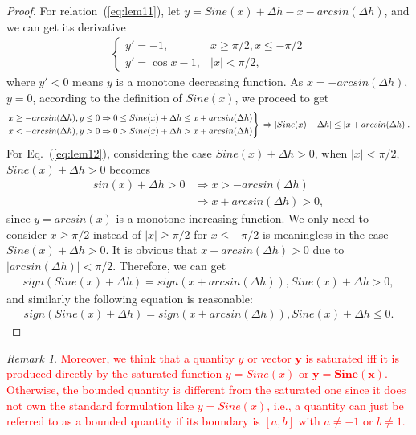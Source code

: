 \documentclass[3p]{elsarticle}
\theoremstyle{plain}
\theoremstyle{remark}
\newtheorem{myrem}{Remark}
\begin{document}
\begin{proof}
For relation~(\ref{eq:lem11}), let $y=Sine(x)+\Delta h-x-arcsin(\Delta h)$, and we can get its derivative
\begin{align}
\begin{cases}
y' = -1,&x\ge\pi/2,x\le-\pi/2\\
y' = \cos x - 1,&\vert x\vert<\pi/2,
\end{cases}
\end{align}
where $y'<0$ means $y$ is a monotone decreasing function. As $x=-arcsin(\Delta h)$, $y=0$, according to the definition of $Sine(x)$, we proceed to get
$$\left.
\begin{aligned}
x\ge-arcsin(\Delta h), y\le0&\Rightarrow 0\le Sine(x)+\Delta h\le x+arcsin(\Delta h)\\
x<-arcsin(\Delta h), y>0&\Rightarrow 0> Sine(x)+\Delta h>x+arcsin(\Delta h)\end{aligned}\right\}\\\\
\Rightarrow\vert Sine(x)+\Delta h\vert\le\vert x+arcsin(\Delta h)\vert.
$$
For Eq.~(\ref{eq:lem12}), considering the case $Sine(x)+\Delta h>0$, when $\vert x\vert<\pi/2$, $Sine(x)+\Delta h>0$ becomes
\begin{align}
sin(x)+\Delta h>0&\Rightarrow x>-arcsin(\Delta h)\\
&\Rightarrow x+arcsin(\Delta h)>0,
\end{align}
since $y=arcsin(x)$ is a monotone increasing function. We only need to consider $x\ge\pi/2$ instead of $\vert x\vert\ge\pi/2$ for $x\le-\pi/2$ is meaningless in the case $Sine(x)+\Delta h>0$. It is obvious that $x+arcsin(\Delta h)>0$ due to $\vert arcsin(\Delta h)\vert<\pi/2$. Therefore, we can get
\begin{align}
sign(Sine(x)+\Delta h)=sign(x+arcsin(\Delta h)),Sine(x)+\Delta h>0,
\end{align}
and similarly the following equation is reasonable:
\begin{align}
sign(Sine(x)+\Delta h)=sign(x+arcsin(\Delta h)),Sine(x)+\Delta h\le0.
\end{align}
\end{proof}
\begin{myrem}\textcolor{red}{Moreover, we think that a quantity $y$ or vector $\bm y$ is saturated iff it is produced directly by the saturated function $y=Sine(x)$ or $\bm y=\bm{Sine(x)}$. Otherwise, the bounded quantity is different from the saturated one since it does not own the standard formulation like $y=Sine(x)$, i.e., a quantity can just be referred to as a bounded quantity if its boundary is $[a,b]$ with $a\neq -1$ or $b\neq 1$.}
\end{myrem}
\end{document}
